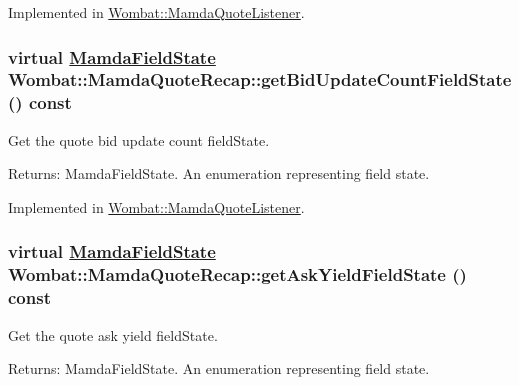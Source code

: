 Implemented in \hyperlink{classWombat_1_1MamdaQuoteListener_a9d06f74666624d69ff4e6303a626532}{Wombat::Mamda\-Quote\-Listener}.\hypertarget{classWombat_1_1MamdaQuoteRecap_a1fde4201397013b41115b90913c4f06}{
\subsubsection[getBidUpdateCountFieldState]{\setlength{\rightskip}{0pt plus 5cm}virtual \hyperlink{namespaceWombat_93aac974f2ab713554fd12a1fa3b7d2a}{Mamda\-Field\-State} Wombat::Mamda\-Quote\-Recap::get\-Bid\-Update\-Count\-Field\-State () const}}
\label{classWombat_1_1MamdaQuoteRecap_a1fde4201397013b41115b90913c4f06}


Get the quote bid update count field\-State. 

\begin{Desc}
\item[Returns:]Mamda\-Field\-State. An enumeration representing field state. \end{Desc}


Implemented in \hyperlink{classWombat_1_1MamdaQuoteListener_94564b543817c0a2c9a0711ae7e63ad5}{Wombat::Mamda\-Quote\-Listener}.\hypertarget{classWombat_1_1MamdaQuoteRecap_ef5f4c7d1f09607a9730da3dc5c782d6}{
\subsubsection[getAskYieldFieldState]{\setlength{\rightskip}{0pt plus 5cm}virtual \hyperlink{namespaceWombat_93aac974f2ab713554fd12a1fa3b7d2a}{Mamda\-Field\-State} Wombat::Mamda\-Quote\-Recap::get\-Ask\-Yield\-Field\-State () const}}
\label{classWombat_1_1MamdaQuoteRecap_ef5f4c7d1f09607a9730da3dc5c782d6}


Get the quote ask yield field\-State. 

\begin{Desc}
\item[Returns:]Mamda\-Field\-State. An enumeration representing field state. \end{Desc}


